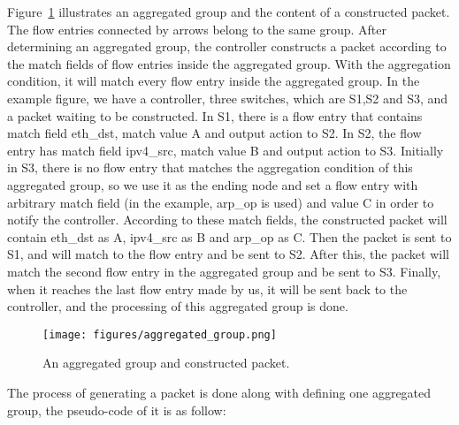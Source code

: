 Figure~\ref{aggregated_group} illustrates an aggregated group and the content of a constructed packet. The flow entries connected by arrows belong to the same group. After determining an aggregated group, the controller constructs a packet according to the match fields of flow entries inside the aggregated group. With the aggregation condition, it will match every flow entry inside the aggregated group. In the example figure, we have a controller, three switches, which are S1,S2 and S3, and a packet waiting to be constructed. In S1, there is a flow entry that contains match field eth\_dst, match value A and output action to S2. In S2, the flow entry has match field ipv4\_src, match value B and output action to S3. Initially in S3, there is no flow entry that matches the aggregation condition of this aggregated group, so we use it as the ending node and set a flow entry with arbitrary match field (in the example, arp\_op is used) and value C in order to notify the controller. According to these match fields, the constructed packet will contain eth\_dst as A, ipv4\_src as B and arp\_op as C. Then the packet is sent to S1, and will match to the flow entry and be sent to S2. After this, the packet will match the second flow entry in the aggregated group and be sent to S3. Finally, when it reaches the last flow entry made by us, it will be sent back to the controller, and the processing of this aggregated group is done. 


\begin{figure}[H]
\begin{center}
\texttt{[image: figures/aggregated\_group.png]}
\end{center}
\caption{An aggregated group and constructed packet.}
\label{aggregated_group}
\end{figure}

The process of generating a packet is done along with defining one aggregated group, the pseudo-code of it is as follow:

